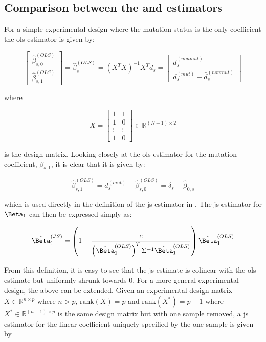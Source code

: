 \subsection{Comparison between the  and  estimators}

For a simple experimental design where the mutation status is the only coefficient the \gls{ols} estimator is given by:

\begin{equation*}
  \begin{bmatrix}
    \hat{\beta}_{s,0}^{(OLS)} \\
    \hat{\beta}_{s,1}^{(OLS)}
  \end{bmatrix}
  = \hat{\beta}_s^{(OLS)}
  = (X^TX)^{-1}X^T d_s
  = \begin{bmatrix}
    \bar{d}_s^{(nonmut)} \\
    d_s^{(mut)} - \bar{d}_s^{(nonmut)}
  \end{bmatrix}
\end{equation*}

where

\begin{equation*}
  X = \begin{bmatrix}
    1 & 1 \\
    1 & 0 \\
    \vdots & \vdots \\
    1 & 0
  \end{bmatrix}
  \in \mathbb{R}^{(N + 1) \times 2}
\end{equation*}

is the design matrix.
Looking closely at the \gls{ols} estimator for the mutation coefficient, $\beta_{s,1}$, it is clear that it is given by:

\begin{equation}
  \hat{\beta}_{s,1}^{(OLS)} = d_s^{(mut)} - \hat{\beta}_{s,0}^{(OLS)} = \delta_s - \hat{\beta}_{0,s}
\end{equation}

which is used directly in the definition of the \gls{js} estimator in .
The \gls{js} estimator for $\Beta_1$ can then be expressed simply as:

\begin{equation}
  \hat{\Beta}_1^{(JS)} = \left( 1 - \frac{c}{\left( \hat{\Beta}_1^{(OLS)} \right)^T \Sigma^{-1} \hat{\Beta}_1^{(OLS)}} \right) \hat{\Beta}_1^{(OLS)}
  \label{eqn:js_defn_ols}
\end{equation}

From this definition, it is easy to see that the \gls{js} estimate is colinear with the \gls{ols} estimate but uniformly shrunk towards 0.
For a more general experimental design, the above can be extended.
Given an experimental design matrix $X \in \mathbb{R}^{n \times p}$ where $n > p$, $\text{rank}(X) = p$ and $\text{rank}(X^*) = p - 1$ where $X^* \in \mathbb{R}^{(n - 1) \times p}$ is the same design matrix but with one sample removed, a \gls{js} estimator for the linear coefficient uniquely specified by the one sample is given by

